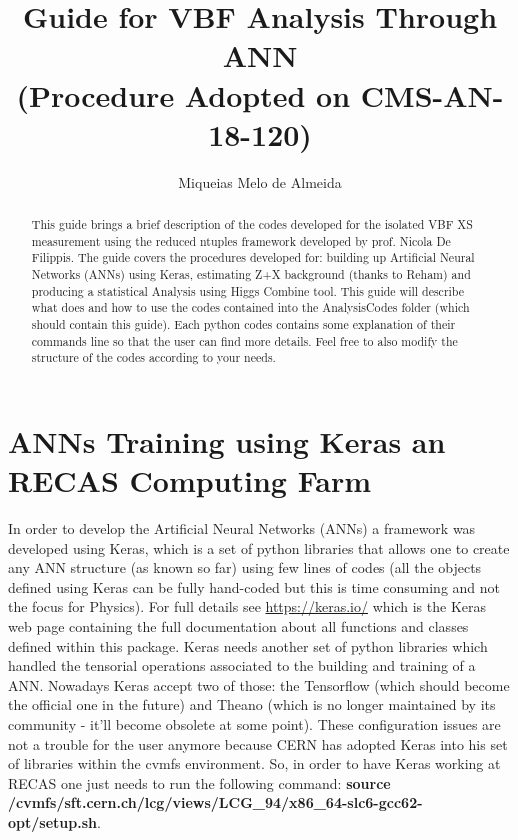 \documentclass[]{report}
\title{\textbf{Guide for VBF Analysis Through ANN}\\
	(Procedure Adopted on CMS-AN-18-120)}
\author{Miqueias Melo de Almeida}
\begin{document}
\maketitle

\begin{abstract}
This guide brings a brief description of the codes developed for the isolated VBF XS measurement using the reduced ntuples framework developed by prof. Nicola De Filippis. The guide covers the procedures developed for: building up Artificial Neural Networks (ANNs) using Keras, estimating Z+X background (thanks to Reham) and producing a statistical Analysis using Higgs Combine tool. This guide will describe what does and how to use the codes contained into the AnalysisCodes folder (which should contain this guide). Each python codes contains some explanation of their commands line so that the user can find more details. Feel free to also modify the structure of the codes according to your needs.
\end{abstract}

\section{ANNs Training using Keras an RECAS Computing Farm}
In order to develop the Artificial Neural Networks (ANNs) a framework was developed using Keras, which is a set of python libraries that allows one to create any ANN structure (as known so far) using few lines of codes (all the objects defined using Keras can be fully hand-coded but this is time consuming and not the focus for Physics). For full details see \url{https://keras.io/} which is the Keras web page containing the full documentation about all functions and classes defined within this package. Keras needs another set of python libraries which handled the tensorial operations associated to the building and training of a ANN. Nowadays Keras accept two of those: the Tensorflow (which should become the official one in the future) and Theano (which is no longer maintained by its community - it'll become obsolete at some point). These configuration issues are not a trouble for the user anymore because CERN has adopted Keras into his set of libraries within the cvmfs environment. So, in order to have Keras working at RECAS one just needs to run the following command: \textbf{source /cvmfs/sft.cern.ch/lcg/views/LCG\_94/x86\_64-slc6-gcc62-opt/setup.sh}. 
\end{document}
